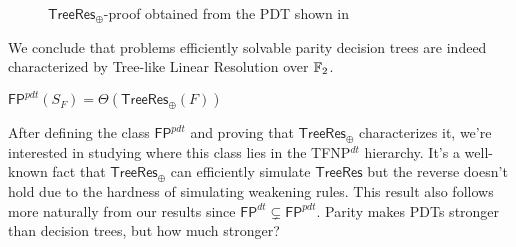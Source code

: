 \begin{figure}[H]
    \centering
    

    \caption{$\mathsf{TreeRes}_\oplus$-proof obtained from the PDT shown in }
\end{figure}

We conclude that problems efficiently solvable parity decision trees are indeed characterized by Tree-like Linear Resolution over $\mathbb{F}_2$.

\begin{theorem}
    $\mathsf{FP}^{pdt}(S_F) = \Theta(\mathsf{TreeRes}_\oplus(F))$
\end{theorem}

After defining the class $\mathsf{FP}^{pdt}$ and proving that $\mathsf{TreeRes}_\oplus$ characterizes it, we're interested in studying where this class lies in the \textsf{TFNP}$^{dt}$ hierarchy. It's a well-known fact that $\mathsf{TreeRes}_\oplus$ can efficiently simulate $\mathsf{TreeRes}$ but the reverse doesn't hold due to the hardness of simulating weakening rules. This result also follows more naturally from our results since $\mathsf{FP}^{dt} \subsetneq \mathsf{FP}^{pdt}$. Parity makes PDTs stronger than decision trees, but how much stronger?

